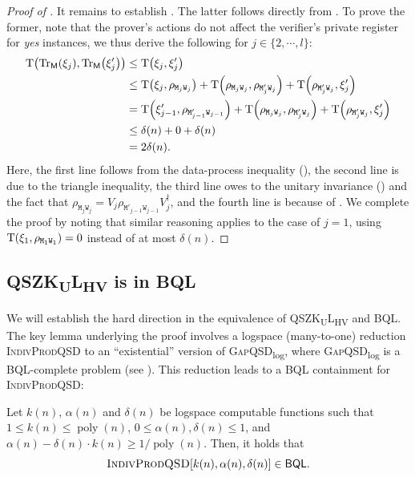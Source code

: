 \documentclass[11pt, a4paper]{article}
\numberwithin{equation}{section}
\numberwithin{figure}{section}
\newcommand{\QSZKULHV}{\texorpdfstring{\textnormal{\textsf{QSZK}\textsubscript{\textnormal{U}}\textsf{L}}\textsubscript{\textnormal{HV}}}\xspace}
\newcommand{\BQL}{\textnormal{\textsf{BQL}}\xspace}
\newcommand{\GapQSDlog}{\texorpdfstring{\textnormal{\textsc{GapQSD}\textsubscript{log}}}\xspace}
\newcommand{\IndivProdQSD}{\textnormal{\textsc{IndivProdQSD}}\xspace}
\DeclarePairedDelimiter\rbra{\lparen}{\rparen}
\newcommand{\Tr}{\mathrm{Tr}}
\newcommand{\td}{\mathrm{T}}
\DeclareMathOperator\poly{poly}
\newcommand{\sfM}{\mathsf{M}}
\newcommand{\ttM}{\mathtt{M}}
\newcommand{\ttW}{\mathtt{W}}
\begin{document}
\begin{proof}[Proof of ]
    It remains to establish . The latter follows directly from . To prove the former, note that the prover's actions do not affect the verifier's private register for \textit{yes} instances, we thus derive the following for $j \in \{2,\cdots,l\}$: 
    \begin{align*}
        \td\rbra*{\Tr_{\sfM}\rbra*{\xi_j}, \Tr_{\sfM}\rbra*{\xi'_j}} 
        &\leq \td\rbra*{\xi_j, \xi'_j} \\
        &\leq \td\rbra*{\xi_j, \rho_{\ttM_j\ttW_j}} + \td\rbra*{\rho_{\ttM_j\ttW_j},\rho_{\ttM'_j\ttW_j}} + \td\rbra*{\rho_{\ttM'_j\ttW_j}, \xi'_j} \\
        &= \td\rbra*{\xi'_{j-1}, \rho_{\ttM'_{j-1}\ttW_{j-1}}} + \td\rbra*{\rho_{\ttM_j\ttW_j},\rho_{\ttM'_j\ttW_j}} + \td\rbra*{\rho_{\ttM'_j\ttW_j}, \xi'_j}\\
        &\leq \delta(n) + 0 + \delta(n)\\
        &= 2\delta(n).
    \end{align*}
    Here, the first line follows from the data-process inequality (), the second line is due to the triangle inequality, the third line owes to the unitary invariance () and the fact that $\rho_{\ttM_j\ttW_j} = V_j \rho_{\ttM'_{j-1}\ttW_{j-1}} V_j^{\dagger}$, and the fourth line is because of . 
    We complete the proof by noting that similar reasoning applies to the case of $j=1$, using $\td\rbra*{\xi_1, \rho_{\ttM_1\ttW_1}} = 0$ instead of at most $\delta(n)$.
\end{proof}

\subsection{\QSZKULHV{} is in \BQL{}}
\label{subsec:QSZKL-in-BQL}

We will establish the hard direction in the equivalence of \QSZKULHV{} and \BQL{}. 
The key lemma underlying the proof involves a logspace (many-to-one) reduction  \IndivProdQSD{} to an ``existential'' version of \GapQSDlog{}, where \GapQSDlog{} is a \BQL{}-complete problem (see ). This reduction leads to a \BQL{} containment for \IndivProdQSD{}: 
\begin{lemma}[\IndivProdQSD{} is in \BQL{}]
    \label{lemma:IndivProdQSD-in-BQL}
    Let $k(n)$, $\alpha(n)$ and $\delta(n)$ be logspace computable functions such that $1 \leq k(n) \leq \poly(n)$, $0 \leq \alpha(n),\delta(n) \leq 1$, and $\alpha(n) - \delta(n) \cdot k(n) \geq 1/\poly(n)$. Then, it holds that
    \[ \IndivProdQSD[k(n),\alpha(n),\delta(n)] \in \BQL. \]
\end{lemma}
\end{document}
